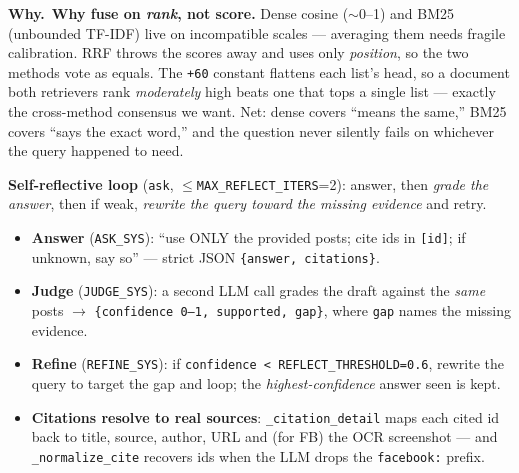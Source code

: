 \documentclass[11pt,a4paper]{article}
\newcommand{\why}[1]{%
  \par\vspace{2pt}%
  \noindent\colorbox{mist}{\begin{minipage}{\dimexpr\linewidth-2\fboxsep}%
  \textcolor{accent2}{\textbf{Why.}}~#1\end{minipage}}\par\vspace{3pt}}
\newcommand{\code}[1]{\texttt{\small #1}}
\begin{document}
\why{\textbf{Why fuse on \emph{rank}, not score.} Dense cosine ($\sim$0--1) and BM25 (unbounded
TF-IDF) live on incompatible scales --- averaging them needs fragile calibration. RRF throws the
scores away and uses only \emph{position}, so the two methods vote as equals. The \code{+60}
constant flattens each list's head, so a document both retrievers rank \emph{moderately} high
beats one that tops a single list --- exactly the cross-method consensus we want. Net: dense
covers ``means the same,'' BM25 covers ``says the exact word,'' and the question never silently
fails on whichever the query happened to need.}

\smallskip
\noindent\textbf{Self-reflective loop} (\code{ask}, $\le$\code{MAX\_REFLECT\_ITERS}=2): answer,
then \emph{grade the answer}, then if weak, \emph{rewrite the query toward the missing evidence}
and retry.

\begin{center}
\end{center}

\begin{itemize}
\item \textbf{Answer} (\code{ASK\_SYS}): ``use ONLY the provided posts; cite ids in \code{[id]};
if unknown, say so'' --- strict JSON \code{\{answer, citations\}}.
\item \textbf{Judge} (\code{JUDGE\_SYS}): a second LLM call grades the draft against the \emph{same}
posts $\rightarrow$ \code{\{confidence 0--1, supported, gap\}}, where \code{gap} names the missing
evidence.
\item \textbf{Refine} (\code{REFINE\_SYS}): if \code{confidence < REFLECT\_THRESHOLD=0.6}, rewrite
the query to target the gap and loop; the \emph{highest-confidence} answer seen is kept.
\item \textbf{Citations resolve to real sources}: \code{\_citation\_detail} maps each cited id
back to title, source, author, URL and (for FB) the OCR screenshot --- and
\code{\_normalize\_cite} recovers ids when the LLM drops the \code{facebook:} prefix.
\end{itemize}
\end{document}
